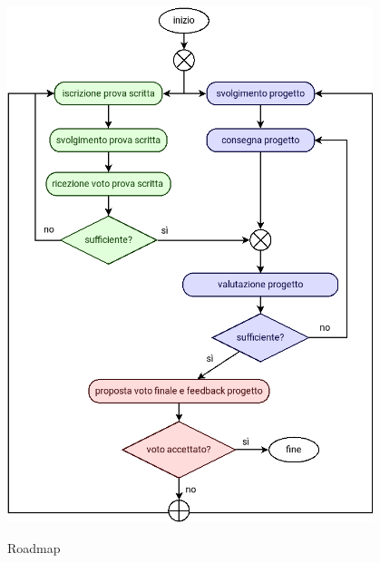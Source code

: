 \documentclass[10pt,a4paper,oneside]{article}
\begin{document}
\begin{figure}
 \includegraphics[width=0.95\textwidth]{assets/roadmap}
 \label{fig:roadmap}
 \caption{Roadmap}
\end{figure}


\end{document}
